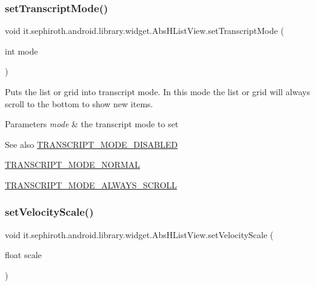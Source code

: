 \subsubsection{\texorpdfstring{set\+Transcript\+Mode()}{setTranscriptMode()}}
{\footnotesize\ttfamily void it.\+sephiroth.\+android.\+library.\+widget.\+Abs\+H\+List\+View.\+set\+Transcript\+Mode (\begin{DoxyParamCaption}\item[{int}]{mode }\end{DoxyParamCaption})}

Puts the list or grid into transcript mode. In this mode the list or grid will always scroll to the bottom to show new items.


\begin{DoxyParams}{Parameters}
{\em mode} & the transcript mode to set\\
\hline
\end{DoxyParams}
\begin{DoxySeeAlso}{See also}
\hyperlink{classit_1_1sephiroth_1_1android_1_1library_1_1widget_1_1_abs_h_list_view_ae9e9ddb1a1226af35cdcc99a268fb58b}{T\+R\+A\+N\+S\+C\+R\+I\+P\+T\+\_\+\+M\+O\+D\+E\+\_\+\+D\+I\+S\+A\+B\+L\+ED} 

\hyperlink{classit_1_1sephiroth_1_1android_1_1library_1_1widget_1_1_abs_h_list_view_a25b0476067d7722fd323bd283c96cdca}{T\+R\+A\+N\+S\+C\+R\+I\+P\+T\+\_\+\+M\+O\+D\+E\+\_\+\+N\+O\+R\+M\+AL} 

\hyperlink{classit_1_1sephiroth_1_1android_1_1library_1_1widget_1_1_abs_h_list_view_a9cd6c736e279c525b81fa03f783d047c}{T\+R\+A\+N\+S\+C\+R\+I\+P\+T\+\_\+\+M\+O\+D\+E\+\_\+\+A\+L\+W\+A\+Y\+S\+\_\+\+S\+C\+R\+O\+LL} 
\end{DoxySeeAlso}
\mbox{\label{classit_1_1sephiroth_1_1android_1_1library_1_1widget_1_1_abs_h_list_view_adb417fecc853fa88432af94033cdbf9e}} 
\subsubsection{\texorpdfstring{set\+Velocity\+Scale()}{setVelocityScale()}}
{\footnotesize\ttfamily void it.\+sephiroth.\+android.\+library.\+widget.\+Abs\+H\+List\+View.\+set\+Velocity\+Scale (\begin{DoxyParamCaption}\item[{float}]{scale }\end{DoxyParamCaption})}

